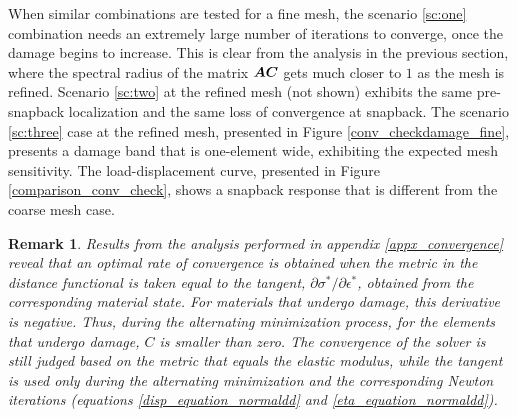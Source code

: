 \documentclass[10pt]{cas-sc}
\newtheorem*{remark}{Remark}
\newcommand{\deleted}[1]{}
\newcommand{\added}[1]{#1}
\begin{document}
When similar combinations are tested for a fine mesh, the \deleted{elastic-no arc length}\added{scenario \ref{sc:one}} combination need\deleted{ed}\added{s} an extremely large number of iterations to converge, once the damage begins to increase. This is clear from the analysis in the previous section, where the spectral radius of the matrix $\mbox{\boldmath $A$} \mbox{\boldmath $C$} $ gets much closer to $1$ as the mesh is refined. \deleted{The tangent-no arc length combination converges at an optimal rate until the snapback instability occurs. At that point, it fails to converge at all. The resulting damage profile from Figure \ref{conv_checkdam_fine_tan_noal}, however, resembles the one obtained by using an arc-length solver in Figure \ref{conv_checkdamage_fine}. The load-displacement curve for this case has not been presented, since the curve is almost linear and shows no special features till the point of unconvergence.}\added{Scenario \ref{sc:two} at the refined mesh (not shown) exhibits the same pre-snapback localization and the same loss of convergence at snapback.} The \deleted{tangent-arc length combination}\added{scenario \ref{sc:three} case at the refined mesh, }presented in Figure \ref{conv_checkdamage_fine}\added{,} presents a damage band that is one-element wide, exhibiting the expected mesh sensitivity. The load-displacement curve, presented in Figure \ref{comparison_conv_check}, shows a snapback response that is different from the coarse mesh case.


\begin{remark}
	Results from the analysis performed in appendix \ref{appx_convergence} reveal that an optimal rate of convergence is obtained when the metric in the distance functional is taken equal to the tangent, ${\partial \sigma^*}/{\partial \epsilon^*}$, obtained from the corresponding material state. For materials that undergo damage, this derivative is negative. Thus, during the alternating minimization process, for the elements that undergo damage, $C$ is smaller than zero. The convergence of the solver is still judged based on the metric that equals the elastic modulus, while the tangent is used only during the alternating minimization and the corresponding Newton iterations (equations \ref{disp_equation_normaldd} and \ref{eta_equation_normaldd}).
\end{remark}
\end{document}
